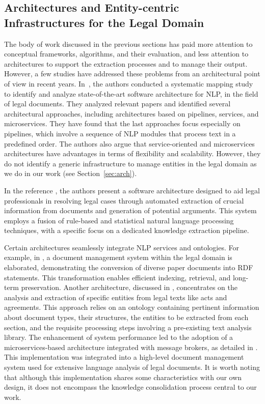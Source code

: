 \subsection{Architectures and Entity-centric Infrastructures for the Legal Domain}
\label{sec:related_arch}
The body of work discussed in the previous sections has paid more attention to conceptual frameworks, algorithms, and their evaluation, and less attention to architectures to support the extraction processes and to manage their output.   
However, a few studies have addressed these problems from an architectural point of view in recent years. In~\cite{PAUZI2023111616}, the authors conducted a systematic mapping study to identify and analyze state-of-the-art software architecture for NLP, in the field of legal documents. They analyzed relevant papers and identified several architectural approaches, including architectures based on pipelines, services, and microservices. 
They have found that the last approaches focus especially on pipelines, which involve a sequence of NLP modules that process text in a predefined order. The authors also argue that service-oriented and microservices architectures have advantages in terms of flexibility and scalability. However, they do not identify a generic infrastructure to manage entities in the legal domain as we do in our work (see Section~\ref{sec:arch}). 

In the reference \cite{9378375}, the authors present a software architecture designed to aid legal professionals in resolving legal cases through automated extraction of crucial information from documents and generation of potential arguments. This system employs a fusion of rule-based and statistical natural language processing techniques, with a specific focus on a dedicated knowledge extraction pipeline.

Certain architectures seamlessly integrate NLP services and ontologies. For example, in \cite{amato2008}, a document management system within the legal domain is elaborated, demonstrating the conversion of diverse paper documents into RDF statements. This transformation enables efficient indexing, retrieval, and long-term preservation.
Another architecture, discussed in \cite{buey2016}, concentrates on the analysis and extraction of specific entities from legal texts like acts and agreements. This approach relies on an ontology containing pertinent information about document types, their structures, the entities to be extracted from each section, and the requisite processing steps involving a pre-existing text analysis library. The enhancement of system performance led to the adoption of a microservices-based architecture integrated with message brokers, as detailed in \cite{ruiz2020}. This implementation was integrated into a high-level document management system used for extensive language analysis of legal documents. It is worth noting that although this implementation shares some characteristics with our own design, it does not encompass the knowledge consolidation process central to our work. 

